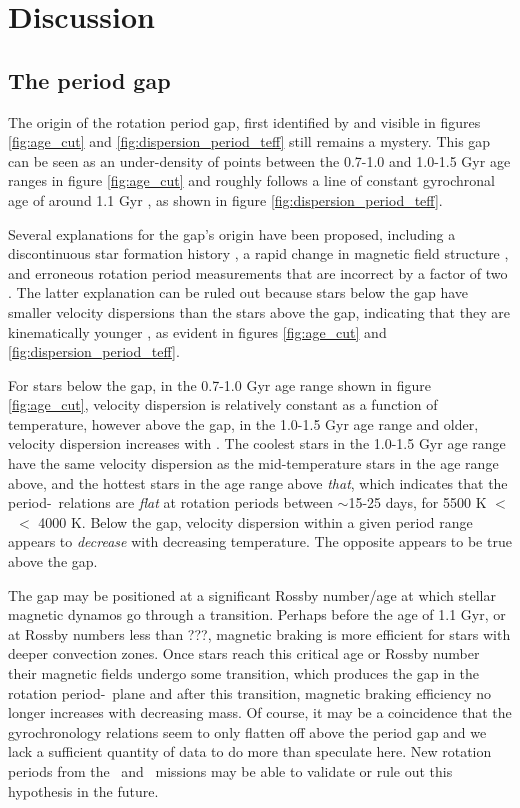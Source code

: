 \section{Discussion}
\label{sec:discussion}

\subsection{The period gap}
\label{sec:period_gap}

The origin of the rotation period gap, first identified by
\citet{mcquillan2013} and visible in figures \ref{fig:age_cut} and
\ref{fig:dispersion_period_teff} still remains a mystery.
This gap can be seen as an under-density of points between the 0.7-1.0 and
1.0-1.5 Gyr age ranges in figure \ref{fig:age_cut} and roughly follows a line
of constant gyrochronal age of around 1.1 Gyr \citep[according to the
gyrochronology relation of][]{angus2019}, as shown in figure
\ref{fig:dispersion_period_teff}.

Several explanations for the gap's origin have been proposed, including a
discontinuous star formation history \citep{mcquillan2013, davenport2017,
davenport2018}, a rapid change in magnetic field structure
\citep{reinhold2019}, and erroneous rotation period measurements that are
incorrect by a factor of two \citep{koen2018}.
The latter explanation can be ruled out because stars below the gap have
smaller velocity dispersions than the stars above the gap, indicating that
they are kinematically younger \citep{mcquillan2013, davenport2018}, as
evident in figures \ref{fig:age_cut} and \ref{fig:dispersion_period_teff}.

For stars below the gap, in the 0.7-1.0 Gyr age range shown in figure
\ref{fig:age_cut}, velocity dispersion is relatively constant as a function of
temperature, however above the gap, in the 1.0-1.5 Gyr age range and older,
velocity dispersion increases with \teff.
The coolest stars in the 1.0-1.5 Gyr age range have the same velocity
dispersion as the mid-temperature stars in the age range above, and the
hottest stars in the age range above {\it that}, which indicates that the
period-\teff\ relations are {\it flat} at rotation periods between $\sim$15-25
days, for 5500 K $<$ \teff\ $<$ 4000 K.
Below the gap, velocity dispersion within a given period range appears to {\it
decrease} with decreasing temperature.
The opposite appears to be true above the gap.

The gap may be positioned at a significant Rossby number/age at which stellar
magnetic dynamos go through a transition.
Perhaps before the age of 1.1 Gyr, or at Rossby numbers less than ???,
magnetic braking is more efficient for stars with deeper convection zones.
Once stars reach this critical age or Rossby number their magnetic fields
undergo some transition, which produces the gap in the rotation period-\teff\
plane and after this transition, magnetic braking efficiency no longer
increases with decreasing mass.
Of course, it may be a coincidence that the gyrochronology relations seem to
only flatten off above the period gap and we lack a sufficient quantity of
data to do more than speculate here.
New rotation periods from the \ktwo\ and \tess\ missions may be able to
validate or rule out this hypothesis in the future.

